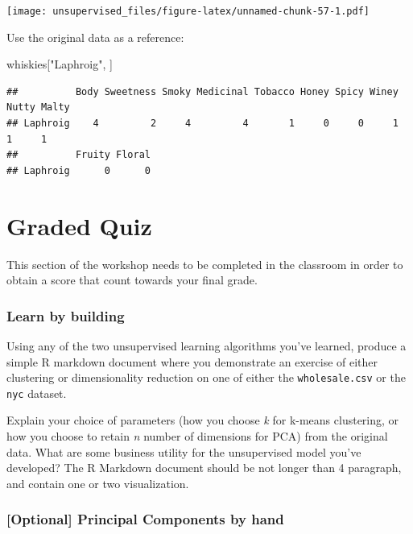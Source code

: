 \documentclass[]{article}
\newenvironment{Shaded}{\begin{snugshade}}{\end{snugshade}}
\newcommand{\NormalTok}[1]{#1}
\newcommand{\StringTok}[1]{\textcolor[rgb]{0.31,0.60,0.02}{#1}}
\begin{document}
\texttt{[image: unsupervised\_files/figure-latex/unnamed-chunk-57-1.pdf]}

Use the original data as a reference:

\begin{Shaded}
\begin{Highlighting}[]
\NormalTok{whiskies[}\StringTok{"Laphroig"}\NormalTok{, ]}
\end{Highlighting}
\end{Shaded}

\begin{verbatim}
##          Body Sweetness Smoky Medicinal Tobacco Honey Spicy Winey Nutty Malty
## Laphroig    4         2     4         4       1     0     0     1     1     1
##          Fruity Floral
## Laphroig      0      0
\end{verbatim}

\hypertarget{graded-quiz}{%
\section{Graded Quiz}\label{graded-quiz}}

This section of the workshop needs to be completed in the classroom in
order to obtain a score that count towards your final grade.

\hypertarget{learn-by-building}{%
\subsubsection{Learn by building}\label{learn-by-building}}

Using any of the two unsupervised learning algorithms you've learned,
produce a simple R markdown document where you demonstrate an exercise
of either clustering or dimensionality reduction on one of either the
\texttt{wholesale.csv} or the \texttt{nyc} dataset.

Explain your choice of parameters (how you choose \emph{k} for k-means
clustering, or how you choose to retain \emph{n} number of dimensions
for PCA) from the original data. What are some business utility for the
unsupervised model you've developed? The R Markdown document should be
not longer than 4 paragraph, and contain one or two visualization.

\hypertarget{optional-principal-components-by-hand}{%
\subsubsection{{[}Optional{]} Principal Components by
hand}\label{optional-principal-components-by-hand}}
\end{document}
